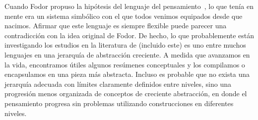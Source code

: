 Cuando Fodor propuso la hipótesis del lenguaje del pensamiento~\cite{fodor1975language}, lo que tenía en mente era un sistema simbólico con el que todos venimos equipados desde que nacimos. Afirmar que este lenguaje es siempre flexible puede parecer una contradicción con la idea original de Fodor. De hecho, lo que probablemente están investigando los estudios en la literatura de \lot (incluido este) es uno entre muchos lenguajes en una jerarquía de abstracción creciente. A medida que avanzamos en la vida, encontramos útiles algunos resúmenes conceptuales y los compilamos o encapsulamos en una pieza más abstracta. Incluso es probable que no exista una jerarquía adecuada con límites claramente definidos entre niveles, sino una progresión menos organizada de conceptos de creciente abstracción, en donde el pensamiento progresa sin problemas utilizando construcciones en diferentes niveles.


